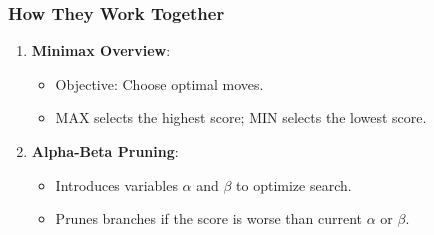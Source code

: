 \documentclass[aspectratio=169]{beamer}
\begin{document}
\begin{frame}[fragile]
    \frametitle{How They Work Together}
    \begin{enumerate}
        \item \textbf{Minimax Overview}:
        \begin{itemize}
            \item Objective: Choose optimal moves.
            \item MAX selects the highest score; MIN selects the lowest score.
        \end{itemize}
        
        \item \textbf{Alpha-Beta Pruning}:
        \begin{itemize}
            \item Introduces variables \(\alpha\) and \(\beta\) to optimize search.
            \item Prunes branches if the score is worse than current \(\alpha\) or \(\beta\).
        \end{itemize}
    \end{enumerate}
\end{frame}
\end{document}
